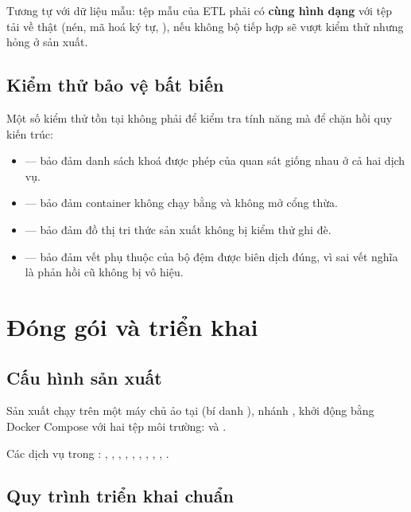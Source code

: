 Tương tự với dữ liệu mẫu: tệp mẫu của ETL phải có \textbf{cùng hình dạng} với tệp tải về
thật (nén, mã hoá ký tự, ), nếu không bộ tiếp hợp sẽ vượt kiểm thử nhưng
hỏng ở sản xuất.

\subsection{Kiểm thử bảo vệ bất biến}

Một số kiểm thử tồn tại không phải để kiểm tra tính năng mà để chặn hồi quy kiến trúc:

\begin{itemize}[leftmargin=1.4em]
  \item {} — bảo đảm danh sách khoá được phép của
  quan sát giống nhau ở cả hai dịch vụ.
  \item {} — bảo đảm container không chạy bằng
   và không mở cổng thừa.
  \item {} — bảo đảm đồ thị tri thức sản xuất không
  bị kiểm thử ghi đè.
  \item {} — bảo đảm vết phụ thuộc của bộ đệm được biên dịch
  đúng, vì sai vết nghĩa là phản hồi cũ không bị vô hiệu.
\end{itemize}

\section{Đóng gói và triển khai}

\subsection{Cấu hình sản xuất}

Sản xuất chạy trên một máy chủ ảo tại  (bí danh
), nhánh , khởi động bằng Docker Compose với hai tệp môi
trường:  và .

Các dịch vụ trong : , ,
, , ,
, , ,
, .

\subsection{Quy trình triển khai chuẩn}

